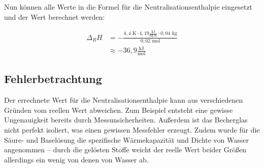 \documentclass[a4paper]{article}
\begin{document}
Nun können alle Werte in die Formel für die Neutralisationsenthalpie eingesetzt und der Wert berechnet werden:

\begin{align*}
    \Delta_R H &= - \frac{4,4 \textrm{ K} \cdot 4,19 \frac{\textrm{kJ}}{\textrm{kg} \cdot \textrm{K}} \cdot 0,04 \textrm{ kg}}{0,02 \textrm{ mol}} \\
    &\approx -36,9 \frac{\textrm{kJ}}{\textrm{mol}}
\end{align*}

\subsection*{Fehlerbetrachtung}
Der errechnete Wert für die Neutralisationsenthalpie kann aus verschiedenen Gründen vom reellen Wert abweichen. Zum Beispiel entsteht eine gewisse Ungenauigkeit bereits durch Messunsicherheiten. Außerdem ist das Becherglas nicht perfekt isoliert, was einen gewissen Messfehler erzeugt. Zudem wurde für die Säure- und Baselösung die spezifische Wärmekapazität und Dichte von Wasser angenommen – durch die gelösten Stoffe weicht der reelle Wert beider Größen allerdings ein wenig von denen von Wasser ab.
\end{document}
